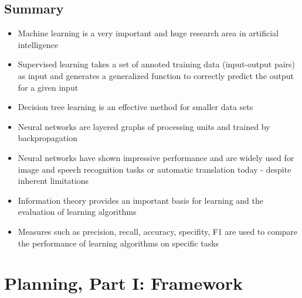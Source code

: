\documentclass[conference, a4paper]{styles/acmsiggraph}
\begin{document}
    \subsection{Summary}
        \begin{itemize}
            \item Machine learning is a very important and huge research area in artificial intelligence
            \item Supervised learning takes a set of annoted training data (input-output pairs) as input and generates a generalized function to correctly predict the output for a given input
            \item Decision tree learning is an effective method for smaller data sets
            \item Neural networks are layered graphs of processing units and trained by backpropagation
            \item Neural networks have shown impressive performance and are widely used for image and speech recognition tasks or automatic translation today - despite inherent limitations
            \item Information theory provides an important basis for learning and the evaluation of learning algorithms
            \item Measures such as precision, recall, accuracy, specifity, F1 are used to compare the performance of learning algorithms on specific tasks
        \end{itemize}

\newpage


\section{Planning, Part I: Framework}
    
\end{document}
